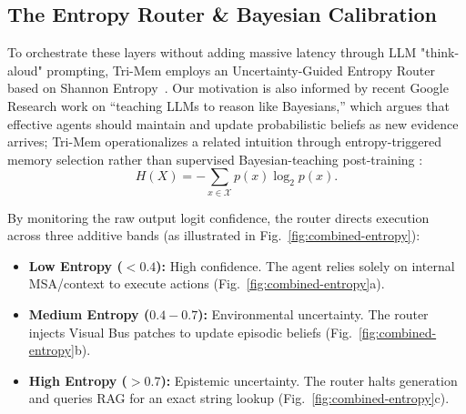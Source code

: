 \documentclass[conference]{IEEEtran}
\begin{document}
\subsection{The Entropy Router \& Bayesian Calibration}
To orchestrate these layers without adding massive latency through LLM "think-aloud" prompting, Tri-Mem employs an Uncertainty-Guided Entropy Router based on Shannon Entropy~\cite{shannon1948}. Our motivation is also informed by recent Google Research work on ``teaching LLMs to reason like Bayesians,'' which argues that effective agents should maintain and update probabilistic beliefs as new evidence arrives; Tri-Mem operationalizes a related intuition through entropy-triggered memory selection rather than supervised Bayesian-teaching post-training \cite{googlebayes2026}:
\begin{equation}
    H(X) = -\sum_{x \in \mathcal{X}} p(x) \log_2 p(x).
\end{equation}

By monitoring the raw output logit confidence, the router directs execution across three additive bands (as illustrated in Fig.~\ref{fig:combined-entropy}):
\begin{itemize}
    \item \textbf{Low Entropy ($< 0.4$):} High confidence. The agent relies solely on internal MSA/context to execute actions (Fig.~\ref{fig:combined-entropy}a).
    \item \textbf{Medium Entropy ($0.4 - 0.7$):} Environmental uncertainty. The router injects Visual Bus patches to update episodic beliefs (Fig.~\ref{fig:combined-entropy}b).
    \item \textbf{High Entropy ($> 0.7$):} Epistemic uncertainty. The router halts generation and queries RAG for an exact string lookup (Fig.~\ref{fig:combined-entropy}c).
\end{itemize}
\end{document}
